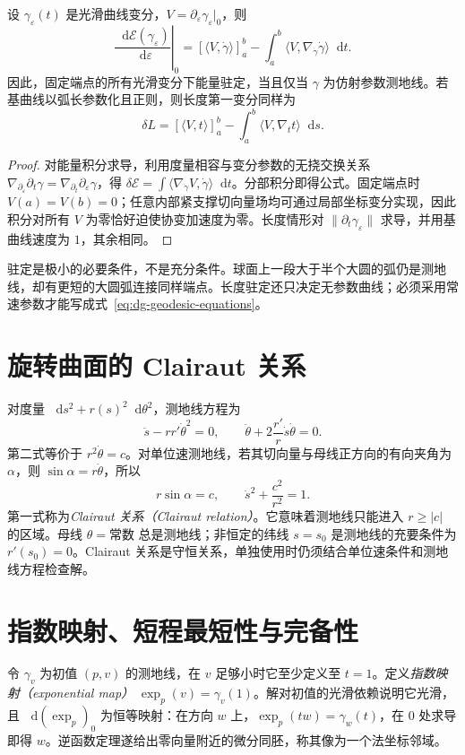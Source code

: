 \documentclass[UTF8,12pt,a4paper,fontset=fandol]{ctexbook}
\newcommand{\dd}{\mathop{}\!\mathrm d}
\newcommand{\ip}[2]{\langle #1,#2\rangle}
\newcommand{\norm}[1]{\lVert #1\rVert}
\begin{document}
\begin{theorem}[第一变分公式]
设 $\gamma_\varepsilon(t)$ 是光滑曲线变分，$V=\partial_\varepsilon\gamma_\varepsilon|_0$，则
\begin{equation}
 \left.\frac{\dd\mathcal E(\gamma_\varepsilon)}{\dd\varepsilon}\right|_0
 =\left[\ip V{\dot\gamma}\right]_a^b
 -\int_a^b\ip V{\nabla_{\dot\gamma}\dot\gamma}\dd t.
 \label{eq:dg-energy-variation}
\end{equation}
因此，固定端点的所有光滑变分下能量驻定，当且仅当 $\gamma$ 为仿射参数测地线。若基曲线以弧长参数化且正则，则长度第一变分同样为
\begin{equation}
 \delta L=\left[\ip Vt\right]_a^b-\int_a^b\ip V{\nabla_t t}\dd s.
 \label{eq:dg-length-variation}
\end{equation}
\end{theorem}
\begin{proof}
对能量积分求导，利用度量相容与变分参数的无挠交换关系 $\nabla_{\partial_\varepsilon}\partial_t\gamma=\nabla_{\partial_t}\partial_\varepsilon\gamma$，得 $\delta\mathcal E=\int\ip{\nabla_{\dot\gamma}V}{\dot\gamma}\dd t$。分部积分即得公式。固定端点时 $V(a)=V(b)=0$；任意内部紧支撑切向量场均可通过局部坐标变分实现，因此积分对所有 $V$ 为零恰好迫使协变加速度为零。长度情形对 $\norm{\partial_t\gamma_\varepsilon}$ 求导，并用基曲线速度为 $1$，其余相同。
\end{proof}
驻定是极小的必要条件，不是充分条件。球面上一段大于半个大圆的弧仍是测地线，却有更短的大圆弧连接同样端点。长度驻定还只决定无参数曲线；必须采用常速参数才能写成式~\eqref{eq:dg-geodesic-equations}。

\section{旋转曲面的 Clairaut 关系}
对度量 $\dd s^2+r(s)^2\dd\theta^2$，测地线方程为
\[
 \ddot s-rr'\dot\theta^2=0,\qquad
 \ddot\theta+2\frac{r'}r\dot s\dot\theta=0.
\]
第二式等价于 $r^2\dot\theta=c$。对单位速测地线，若其切向量与母线正方向的有向夹角为 $\alpha$，则 $\sin\alpha=r\dot\theta$，所以
\begin{equation}
 r\sin\alpha=c,\qquad
 \dot s^2+\frac{c^2}{r^2}=1.
 \label{eq:dg-clairaut}
\end{equation}
第一式称为\emph{Clairaut 关系（Clairaut relation）}。它意味着测地线只能进入 $r\ge|c|$ 的区域。母线 $\theta=\text{常数}$ 总是测地线；非恒定的纬线 $s=s_0$ 是测地线的充要条件为 $r'(s_0)=0$。Clairaut 关系是守恒关系，单独使用时仍须结合单位速条件和测地线方程检查解。

\section{指数映射、短程最短性与完备性}
令 $\gamma_v$ 为初值 $(p,v)$ 的测地线，在 $v$ 足够小时它至少定义至 $t=1$。定义\emph{指数映射（exponential map）} $\exp_p(v)=\gamma_v(1)$。解对初值的光滑依赖说明它光滑，且 $\dd(\exp_p)_0$ 为恒等映射：在方向 $w$ 上，$\exp_p(tw)=\gamma_w(t)$，在 $0$ 处求导即得 $w$。逆函数定理遂给出零向量附近的微分同胚，称其像为一个法坐标邻域。
\end{document}
